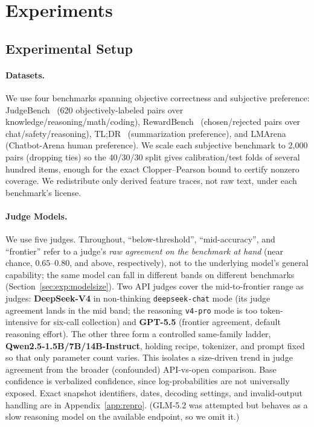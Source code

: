 
\section{Experiments}
\label{sec:experiments}

\subsection{Experimental Setup}
\label{sec:exp:setup}

\paragraph{Datasets.}
We use four benchmarks spanning objective correctness and subjective preference: JudgeBench~\citep{tan2024judgebench} (620 objectively-labeled pairs over knowledge/reasoning/math/coding), RewardBench~\citep{lambert2024rewardbench} (chosen/rejected pairs over chat/safety/reasoning), TL;DR~\citep{stiennon2020learning} (summarization preference), and LMArena~\citep{zheng2023judging} (Chatbot-Arena human preference). We scale each subjective benchmark to 2{,}000 pairs (dropping ties) so the 40/30/30 split gives calibration/test folds of several hundred items, enough for the exact Clopper--Pearson bound to certify nonzero coverage. We redistribute only derived feature traces, not raw text, under each benchmark's license.

\paragraph{Judge Models.}
We use five judges. Throughout, ``below-threshold'', ``mid-accuracy'', and ``frontier'' refer to a judge's \emph{raw agreement on the benchmark at hand} (near chance, $0.65$--$0.80$, and above, respectively), not to the underlying model's general capability; the same model can fall in different bands on different benchmarks (Section~\ref{sec:exp:modelsize}). Two API judges cover the mid-to-frontier range as judges: \textbf{DeepSeek-V4} in non-thinking \texttt{deepseek-chat} mode (its judge agreement lands in the mid band; the reasoning \texttt{v4-pro} mode is too token-intensive for six-call collection) and \textbf{GPT-5.5} (frontier agreement, default reasoning effort). The other three form a controlled same-family ladder, \textbf{Qwen2.5-1.5B/7B/14B-Instruct}, holding recipe, tokenizer, and prompt fixed so that only parameter count varies. This isolates a size-driven trend in judge agreement from the broader (confounded) API-vs-open comparison. Base confidence is verbalized confidence, since log-probabilities are not universally exposed. Exact snapshot identifiers, dates, decoding settings, and invalid-output handling are in Appendix~\ref{app:repro}. (GLM-5.2 was attempted but behaves as a slow reasoning model on the available endpoint, so we omit it.)

